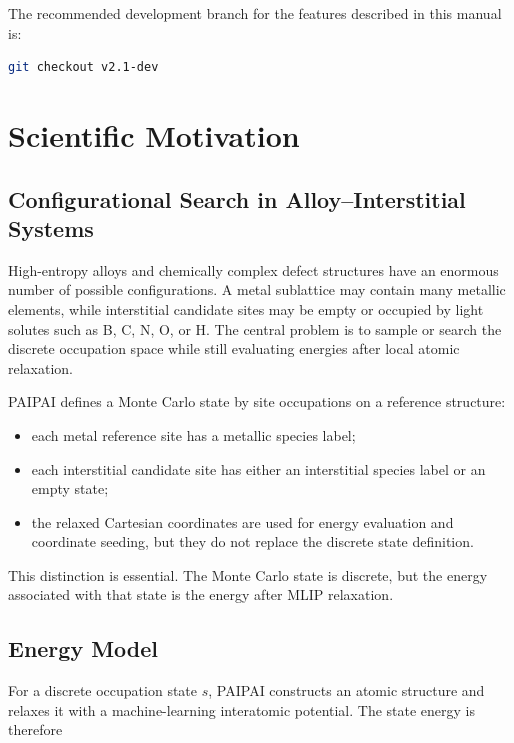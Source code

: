 \documentclass[11pt]{article}
\newcommand{\PAIPAI}{\textsc{PAIPAI}}
\begin{document}
The recommended development branch for the features described in this manual is:

\begin{lstlisting}[language=bash]
git checkout v2.1-dev
\end{lstlisting}

\section{Scientific Motivation}

\subsection{Configurational Search in Alloy--Interstitial Systems}

High-entropy alloys and chemically complex defect structures have an enormous number of possible configurations.
A metal sublattice may contain many metallic elements, while interstitial candidate sites may be empty or occupied by light solutes such as B, C, N, O, or H.
The central problem is to sample or search the discrete occupation space while still evaluating energies after local atomic relaxation.

\PAIPAI{} defines a Monte Carlo state by site occupations on a reference structure:

\begin{itemize}
  \item each metal reference site has a metallic species label;
  \item each interstitial candidate site has either an interstitial species label or an empty state;
  \item the relaxed Cartesian coordinates are used for energy evaluation and coordinate seeding, but they do not replace the discrete state definition.
\end{itemize}

This distinction is essential. The Monte Carlo state is discrete, but the energy associated with that state is the energy after MLIP relaxation.

\subsection{Energy Model}

For a discrete occupation state $s$, \PAIPAI{} constructs an atomic structure and relaxes it with a machine-learning interatomic potential.
The state energy is therefore
\end{document}
